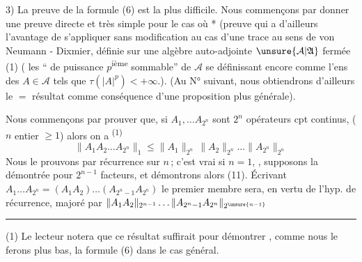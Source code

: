 3) La preuve de la formule (6) est la plus difficile.
Nous commençons par donner une
preuve directe et très simple pour le cas où
  *
(preuve qui a d'ailleurs l'avantage
de  s'appliquer sans modification au cas d'une
trace  au sens de von Neumann - Dixmier, définie
sur une algèbre auto-adjointe $\unsure{\mathcal A|\mathfrak A}$ 
  fermée 
(1) (  les ``  de puissance
$p$\textsuperscript{ième} sommable'' de $\mathcal A$ 
se définissant encore
comme l'ens des $A\in\mathcal A$ tels que
$\tau(|A|^p)<+\infty$.)\unsure{\textsuperscript{*}}.
(Au N° suivant, nous
obtiendrons d'ailleurs le $=$ résultat comme
conséquence d'une proposition plus générale).

Nous commençons par prouver que, si
$A_1,\ldots A_{2^n}$ sont $2^n$ opérateurs cpt continus,
($n$ entier $\geq1$) alors on a \textsuperscript{(1)}
\[
\|A_1 A_2\ldots A_{2^n}\|_1\leq\|A_1\|_{2^n}\,\|A_2\|_{2^n}\ldots\|A_{2^n}\|_{2^n}\tag*{(11)}
\]
Nous le prouvons par récurrence sur $n$\,;
c'est vrai si $n=1$,  , supposons
la  démontrée pour $2^{n-1}$ facteurs, et démontrons
alors (11). Écrivant $A_1\ldots A_{2^n}=(A_1A_2)\ldots(A_{2^n-1}A_{2^n})$
le premier membre sera, en vertu de l'hyp.
de récurrence, majoré par $\|A_1A_2\|_{2^{n-1}}\ldots\|A_{2^n-1}A_{2^n}\|_{2^{\unsure{n-1}}}$

\noindent\rule{\linewidth}{0.3pt}

(1) Le lecteur notera que ce résultat suffirait pour
démontrer  , comme nous le ferons plus bas,
la formule (6) dans le cas général.
